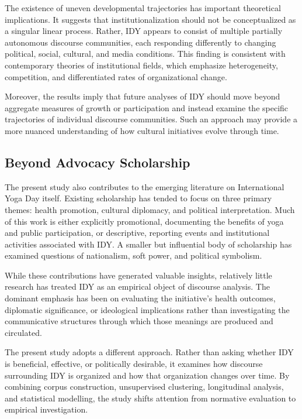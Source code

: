\documentclass[11pt]{article}
\begin{document}
The existence of uneven developmental trajectories has important theoretical implications. It suggests that
institutionalization should not be conceptualized as a singular linear process. Rather, IDY appears to consist of
multiple partially autonomous discourse communities, each responding differently to changing political, social,
cultural, and media conditions. This finding is consistent with contemporary theories of institutional fields, which
emphasize heterogeneity, competition, and differentiated rates of organizational change.


Moreover, the results imply that future analyses of IDY should move beyond aggregate measures of growth or participation
and instead examine the specific trajectories of individual discourse communities. Such an approach may provide a more
nuanced understanding of how cultural initiatives evolve through time.


\subsection{Beyond Advocacy Scholarship}



The present study also contributes to the emerging literature on International Yoga Day itself. Existing scholarship has
tended to focus on three primary themes: health promotion, cultural diplomacy, and political interpretation. Much of
this work is either explicitly promotional, documenting the benefits of yoga and public participation, or descriptive,
reporting events and institutional activities associated with IDY. A smaller but influential body of scholarship has
examined questions of nationalism, soft power, and political symbolism.


While these contributions have generated valuable insights, relatively little research has treated IDY as an empirical
object of discourse analysis. The dominant emphasis has been on evaluating the initiative's health outcomes, diplomatic
significance, or ideological implications rather than investigating the communicative structures through which those
meanings are produced and circulated.


The present study adopts a different approach. Rather than asking whether IDY is beneficial, effective, or politically
desirable, it examines how discourse surrounding IDY is organized and how that organization changes over time. By
combining corpus construction, unsupervised clustering, longitudinal analysis, and statistical modelling, the study
shifts attention from normative evaluation to empirical investigation.
\end{document}
